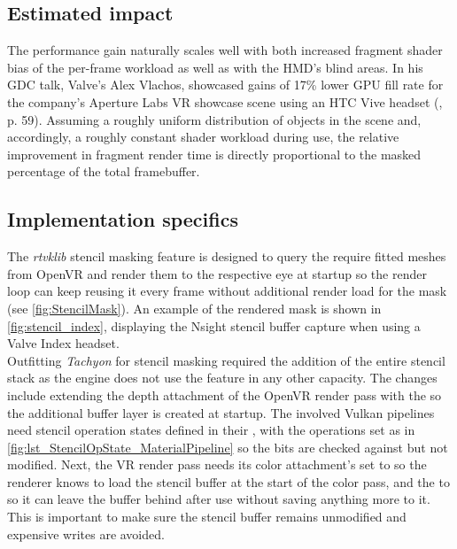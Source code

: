 \subsection{Estimated impact}
The performance gain naturally scales well with both increased fragment shader bias of the per-frame workload as well as with the HMD's blind areas. In his GDC talk, Valve's Alex Vlachos, showcased gains of 17\% lower GPU fill rate for the company's Aperture Labs \gls{VR} showcase scene using an HTC Vive headset (\cite{Vlachos.2015}, p. 59). 
Assuming a roughly uniform distribution of objects in the scene and, accordingly, a roughly constant shader workload during use, the relative improvement in fragment render time is directly proportional to the masked percentage of the total framebuffer. 

\subsection{Implementation specifics}
The \textit{rtvklib} stencil masking feature is designed to query the require fitted meshes from OpenVR and render them to the respective eye at startup so the render loop can keep reusing it every frame without additional render load for the mask (see \autoref{fig:StencilMask}). An example of the rendered mask is shown in \autoref{fig:stencil_index}, displaying the Nsight stencil buffer capture when using a Valve Index headset. \\
Outfitting \textit{\gls{Tachyon}} for stencil masking required the addition of the entire stencil stack as the engine does not use the feature in any other capacity. The changes include extending the depth attachment of the OpenVR render pass with the  so the additional buffer layer is created at startup. The involved Vulkan pipelines need stencil operation states defined in their , with the operations set as in \autoref{fig:lst_StencilOpState_MaterialPipeline} so the bits are checked against but not modified. Next, the \gls{VR} render pass needs its color attachment's  set to  so the renderer knows to load the stencil buffer at the start of the color pass, and the  to  so it can leave the buffer behind after use without saving anything more to it. This is important to make sure the stencil buffer remains unmodified and expensive writes are avoided. 

